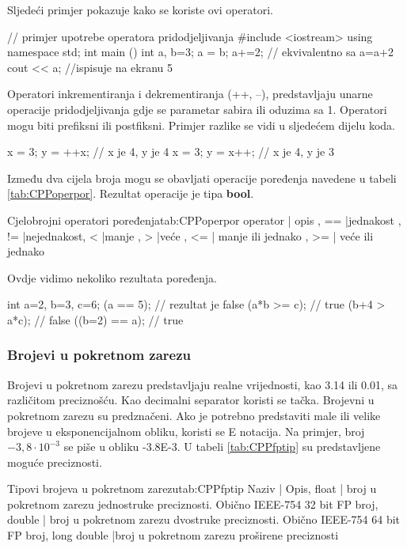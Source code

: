 \documentclass[11pt]{book}
\begin{document}
Sljedeći primjer pokazuje kako se koriste ovi operatori.

\begin{shortlisting}
  // primjer upotrebe operatora pridodjeljivanja
  #include <iostream>
  using namespace std;
  int main ()
    {
      int a, b=3;
      a = b;
      a+=2;             // ekvivalentno sa a=a+2
      cout << a;   //ispisuje na ekranu 5
    }
\end{shortlisting}

Operatori inkrementiranja i dekrementiranja (++, --), predstavljaju unarne operacije pridodjeljivanja gdje se parametar sabira ili oduzima sa 1. Operatori mogu biti prefiksni ili postfiksni. Primjer razlike se vidi u sljedećem dijelu koda.

\begin{shortlisting}
  x = 3; y = ++x;
  // x je 4, y je 4
  x = 3; y = x++;
  // x je 4, y je 3
\end{shortlisting}

Između dva cijela broja mogu se obavljati operacije poređenja navedene u tabeli \ref{tab:CPPoperpor}.  Rezultat operacije je tipa \textbf{bool}.

 {Cjelobrojni operatori poređenja}{tab:CPPoperpor}
{
  operator | opis ,
  ==  |jednakost ,
  !=  |nejednakost,
  <  |manje ,
  >  |veće ,
  <= | manje ili jednako ,
  >= | veće ili jednako
}

Ovdje vidimo nekoliko rezultata poređenja.

\begin{shortlisting}
  int a=2, b=3, c=6;
  (a == 5);     // rezultat je false
  (a*b >= c);   // true
  (b+4 > a*c);  // false
  ((b=2) == a); // true
\end{shortlisting}

\subsubsection {Brojevi u pokretnom zarezu}
Brojevi u pokretnom zarezu predstavljaju  realne  vrijednosti,  kao  3.14  ili  0.01, sa  različitom  preciznošću.  Kao decimalni separator koristi se tačka. Brojevni u pokretnom zarezu su predznačeni. Ako je potrebno predstaviti male ili velike brojeve u eksponencijalnom obliku, koristi se E notacija. Na primjer, broj $-3,8 \cdot 10 ^ {-3} $ se piše u obliku -3.8E-3. U  tabeli \ref{tab:CPPfptip} su predstavljene moguće preciznosti.

 {Tipovi brojeva u pokretnom zarezu}{tab:CPPfptip}
{
  Naziv | Opis,
  float | broj u pokretnom zarezu jednostruke preciznosti. Obično IEEE-754 32  bit FP broj,
  double | broj u pokretnom zarezu dvostruke preciznosti. Obično IEEE-754 64  bit FP broj,
  long  double  |broj u pokretnom zarezu proširene preciznosti
}
\end{document}
